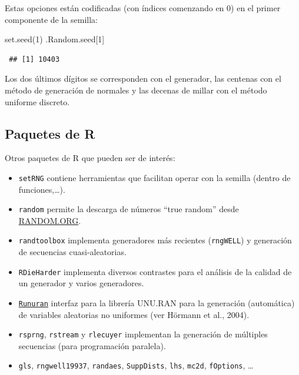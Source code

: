 \documentclass[
]{book}
\newenvironment{Shaded}{\begin{snugshade}}{\end{snugshade}}
\newcommand{\DecValTok}[1]{\textcolor[rgb]{0.00,0.00,0.81}{#1}}
\newcommand{\FunctionTok}[1]{\textcolor[rgb]{0.00,0.00,0.00}{#1}}
\newcommand{\NormalTok}[1]{#1}
\theoremstyle{break}
\theoremstyle{nonumberplain}
\begin{document}
Estas opciones están codificadas (con índices comenzando en 0) en el primer componente de la semilla:

\begin{Shaded}
\begin{Highlighting}[]
\FunctionTok{set.seed}\NormalTok{(}\DecValTok{1}\NormalTok{)}
\NormalTok{.Random.seed[}\DecValTok{1}\NormalTok{]}
\end{Highlighting}
\end{Shaded}

\begin{verbatim}
 ## [1] 10403
\end{verbatim}

Los dos últimos dígitos se corresponden con el generador, las centenas con el método de generación de normales y las decenas de millar con el método uniforme discreto.

\hypertarget{paquetes-de-r}{%
\subsection{Paquetes de R}\label{paquetes-de-r}}

Otros paquetes de R que pueden ser de interés:

\begin{itemize}
\item
  \texttt{setRNG} contiene herramientas que facilitan operar con la semilla
  (dentro de funciones,\ldots).
\item
  \texttt{random} permite la descarga de números ``true random'' desde \href{https://www.random.org}{RANDOM.ORG}.
\item
  \texttt{randtoolbox} implementa generadores más recientes (\texttt{rngWELL}) y
  generación de secuencias cuasi-aleatorias.
\item
  \texttt{RDieHarder} implementa diversos contrastes para el análisis de la
  calidad de un generador y varios generadores.
\item
  \href{http://statmath.wu.ac.at/unuran}{\texttt{Runuran}} interfaz para la librería UNU.RAN para la
  generación (automática) de variables aleatorias no uniformes (ver Hörmann et al., 2004).
\item
  \texttt{rsprng}, \texttt{rstream} y \texttt{rlecuyer} implementan la generación de múltiples
  secuencias (para programación paralela).
\item
  \texttt{gls}, \texttt{rngwell19937}, \texttt{randaes}, \texttt{SuppDists}, \texttt{lhs}, \texttt{mc2d},
  \texttt{fOptions}, \ldots{}
\end{itemize}
\end{document}
